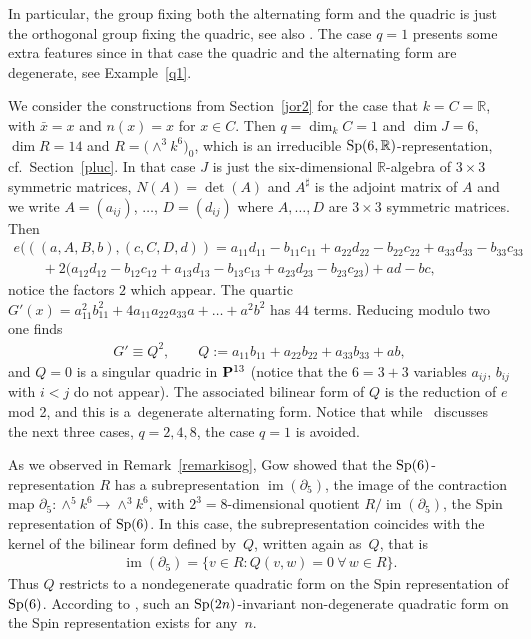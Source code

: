 \documentclass[10pt,a4paper]{amsart}
\newcommand{\RR}{{\mathbb R}}
\newcommand{\PP}{{\bf P}}
\newcommand{\im}{\operatorname{im}}
\numberwithin{equation}{section}
\begin{document}
In particular, the group fixing both the alternating form and the quadric is just the orthogonal group fixing the quadric, see also \cite[Remark~20]{Kru}. The case $q=1$ presents some extra features since in that case the quadric and the alternating form are degenerate, see Example~\ref{q1}.

\begin{Example}[$q=1$]\label{q1} We consider the constructions from Section~\ref{jor2} for the case that $k=C=\RR$, with $\bar{x}=x$ and $n(x)=x$ for $x\in C$. Then $q=\dim_kC=1$ and $\dim J=6$, $\dim R=14$ and $R=\big({\wedge}^3k^6\big)_0$, which is an irreducible ${\rm Sp}(6,\RR)$-representation, cf.\ Section~\ref{pluc}. In that case $J$ is just the six-dimensional $\RR$-algebra of $3\times 3$ symmetric matrices, $N(A)=\det(A)$ and $A^\sharp$ is the adjoint matrix of $A$ and we write $A=(a_{ij})$, $\ldots$, $D=(d_{ij})$ where $A,\ldots,D$ are $3\times 3$ symmetric matrices. Then
\begin{gather*}
e(((a,A,B,b),(c,C,D,d))=a_{11}d_{11 }- b_{11}c_{11} + a_{22}d_{22 }- b_{22}c_{22} +a_{33}d_{33 }- b_{33}c_{33} \\
\qquad{} +2\bigl(a_{12}d_{12 }- b_{12}c_{12} + a_{13}d_{13 }- b_{13}c_{13} + a_{23}d_{23} - b_{23}c_{23 }) + ad - bc,
\end{gather*}
notice the factors $2$ which appear. The quartic $G'(x)=a_{11}^2b_{11}^2 + 4a_{11}a_{22}a_{33}a+\dots+a^2b^2$ has $44$ terms. Reducing modulo two one finds
\begin{gather*}
G' \equiv Q^2,\qquad Q := a_{11}b_{11} + a_{22}b_{22} + a_{33}b_{33} + ab,
\end{gather*}
and $Q=0$ is a singular quadric in $\PP^{13}$ (notice that the $6=3+3$ variables $a_{ij}$, $b_{ij}$ with $i<j$ do not appear). The associated bilinear form of $Q$ is the reduction of $e$ mod 2, and this is a~degenerate alternating form. Notice that while~\cite{Kru} discusses the next three cases, $q=2,4,8$, the case $q=1$ is avoided.

As we observed in Remark~\ref{remarkisog}, Gow showed that the ${\rm Sp}(6)$-representation $R$ has a subrepresentation $\im(\partial_{5})$, the image of the contraction map $\partial_5\colon \wedge^5 k^6 \rightarrow\wedge^3k^6$, with $2^3=8$-dimensional quotient $R/\im(\partial_5)$, the Spin representation of ${\rm Sp}(6)$. In this case, the subrepresentation coincides with the kernel of the bilinear form defined by~$Q$, written again as~$Q$, that is
\begin{gather*}
\im(\partial_{5}) = \{ v\in R\colon Q(v,w)=0\ \forall\, w\in R \}.
\end{gather*}
Thus $Q$ restricts to a nondegenerate quadratic form on the Spin representation of ${\rm Sp}(6)$. According to \cite[Section~4]{Gow}, such an ${\rm Sp}(2n)$-invariant non-degenerate quadratic form on the Spin representation exists for any~$n$.
\end{Example}
\end{document}

